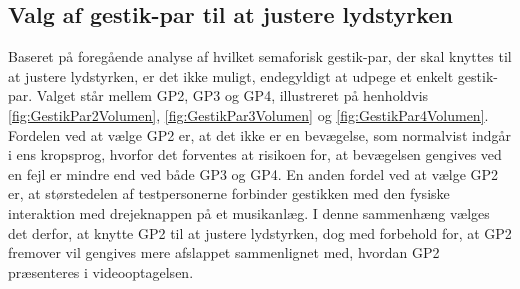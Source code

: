 \subsection{Valg af gestik-par til at justere lydstyrken}
\label{TestresultaterValgAfGestikkerValgVolumen}
%
Baseret på foregående analyse af hvilket semaforisk gestik-par, der skal knyttes til at justere lydstyrken, er det ikke muligt, endegyldigt at udpege et enkelt gestik-par. Valget står mellem GP2, GP3 og GP4, illustreret på henholdvis \autoref{fig:GestikPar2Volumen}, \autoref{fig:GestikPar3Volumen} og \autoref{fig:GestikPar4Volumen}. Fordelen ved at vælge GP2 er, at det ikke er en bevægelse, som normalvist indgår i ens kropsprog, hvorfor det forventes at risikoen for, at bevægelsen gengives ved en fejl er mindre end ved både GP3 og GP4. En anden fordel ved at vælge GP2 er, at størstedelen af testpersonerne forbinder gestikken med den fysiske interaktion med drejeknappen på et musikanlæg. I denne sammenhæng vælges det derfor, at knytte GP2 til at justere lydstyrken, dog med forbehold for, at GP2 fremover vil gengives mere afslappet sammenlignet med, hvordan GP2 præsenteres i videooptagelsen.    

